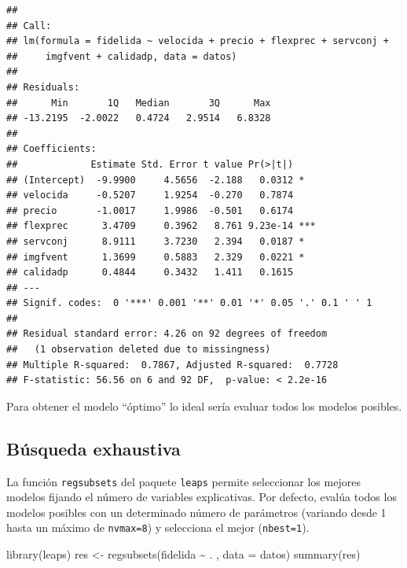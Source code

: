 \documentclass[
]{book}
\newenvironment{Shaded}{\begin{snugshade}}{\end{snugshade}}
\newcommand{\AttributeTok}[1]{\textcolor[rgb]{0.77,0.63,0.00}{#1}}
\newcommand{\FunctionTok}[1]{\textcolor[rgb]{0.00,0.00,0.00}{#1}}
\newcommand{\NormalTok}[1]{#1}
\newcommand{\OtherTok}[1]{\textcolor[rgb]{0.56,0.35,0.01}{#1}}
\newcommand{\SpecialCharTok}[1]{\textcolor[rgb]{0.00,0.00,0.00}{#1}}
\theoremstyle{break}
\theoremstyle{nonumberplain}
\begin{document}
\begin{verbatim}
## 
## Call:
## lm(formula = fidelida ~ velocida + precio + flexprec + servconj + 
##     imgfvent + calidadp, data = datos)
## 
## Residuals:
##      Min       1Q   Median       3Q      Max 
## -13.2195  -2.0022   0.4724   2.9514   6.8328 
## 
## Coefficients:
##             Estimate Std. Error t value Pr(>|t|)    
## (Intercept)  -9.9900     4.5656  -2.188   0.0312 *  
## velocida     -0.5207     1.9254  -0.270   0.7874    
## precio       -1.0017     1.9986  -0.501   0.6174    
## flexprec      3.4709     0.3962   8.761 9.23e-14 ***
## servconj      8.9111     3.7230   2.394   0.0187 *  
## imgfvent      1.3699     0.5883   2.329   0.0221 *  
## calidadp      0.4844     0.3432   1.411   0.1615    
## ---
## Signif. codes:  0 '***' 0.001 '**' 0.01 '*' 0.05 '.' 0.1 ' ' 1
## 
## Residual standard error: 4.26 on 92 degrees of freedom
##   (1 observation deleted due to missingness)
## Multiple R-squared:  0.7867, Adjusted R-squared:  0.7728 
## F-statistic: 56.56 on 6 and 92 DF,  p-value: < 2.2e-16
\end{verbatim}

Para obtener el modelo ``óptimo'' lo ideal sería evaluar todos los modelos posibles.

\hypertarget{buxfasqueda-exhaustiva}{%
\subsection{Búsqueda exhaustiva}\label{buxfasqueda-exhaustiva}}

La función \texttt{regsubsets} del paquete \texttt{leaps} permite seleccionar los mejores modelos
fijando el número de variables explicativas.
Por defecto, evalúa todos los modelos posibles con un determinado número de
parámetros (variando desde 1 hasta un máximo de \texttt{nvmax=8})
y selecciona el mejor (\texttt{nbest=1}).

\begin{Shaded}
\begin{Highlighting}[]
\FunctionTok{library}\NormalTok{(leaps)}
\NormalTok{res }\OtherTok{\textless{}{-}} \FunctionTok{regsubsets}\NormalTok{(fidelida }\SpecialCharTok{\textasciitilde{}}\NormalTok{ . , }\AttributeTok{data =}\NormalTok{ datos)}
\FunctionTok{summary}\NormalTok{(res)}
\end{Highlighting}
\end{Shaded}
\end{document}
